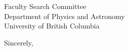 \documentclass[12pt]{letter}
\begin{document}
\begin{letter}{
               Faculty Search Committee \\
               Department of Physics and Astronomy \\
               University of British Columbia
           }
\closing{Sincerely,}
\vspace{-0.9in}
\\
\end{letter}
\end{document}
